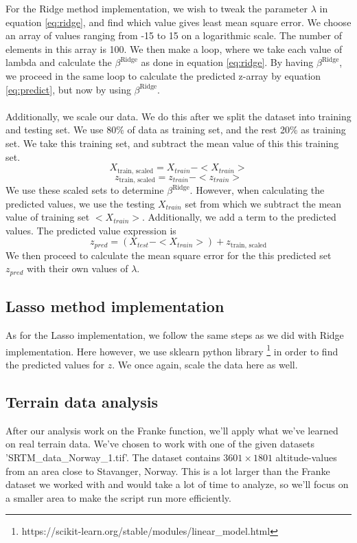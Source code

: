 \documentclass[reprint,english,notitlepage]{revtex4-1}  %
\begin{document}
For the Ridge method implementation, we wish to tweak the parameter $\lambda$ in equation \ref{eq:ridge}, and find which value gives least mean square error. We choose an array of values ranging from -15 to 15 on a logarithmic scale. The number of elements in this array is 100. We then make a loop, where we take each value of lambda and calculate the $\beta^{\text{Ridge}}$ as done in equation \ref{eq:ridge}. By having $\beta^{\text{Ridge}}$, we proceed in the same loop to calculate the predicted z-array by equation \ref{eq:predict}, but now by using $\beta^{\text{Ridge}}$.\\
\\
Additionally, we scale our data. We do this after we split the dataset into training and testing set. We use 80\% of data as training set, and the rest 20\% as training set. We take this training set, and subtract the mean value of this this training set.
$$X_{\text{train, scaled}} = X_{train} - <X_{train}>$$
$$z_{\text{train, scaled}} = z_{train} - <z_{train}>$$
We use these scaled sets to determine $\beta^{\text{Ridge}}$.
However, when calculating the predicted values, we use the testing $X_{train}$ set from which we subtract the mean value of training set $<X_{train}>$. Additionally, we add a term to the predicted values. The predicted value expression is
$$z_{pred} = (X_{test} - <X_{train}>) + z_{\text{train, scaled}}$$
We then proceed to calculate the mean square error for the this predicted set $z_{pred}$ with their own values of $\lambda$. 









\subsection{Lasso method implementation}
As for the Lasso implementation, we follow the same steps as we did with Ridge implementation. Here however, we use sklearn python library \footnote{https://scikit-learn.org/stable/modules/linear_model.html} in order to find the predicted values for $z$. We once again, scale the data here as well. 

\subsection{Terrain data analysis}

After our analysis work on the Franke function, we'll apply what we've learned on real terrain data. We've chosen to work with one of the given datasets 'SRTM\_data\_Norway\_1.tif'. The dataset contains $3601 \times 1801$ altitude-values from an area close to Stavanger, Norway. This is a lot larger than the Franke dataset we worked with and would take a lot of time to analyze, so we'll focus on a smaller area to make the script run more efficiently.
\end{document}
